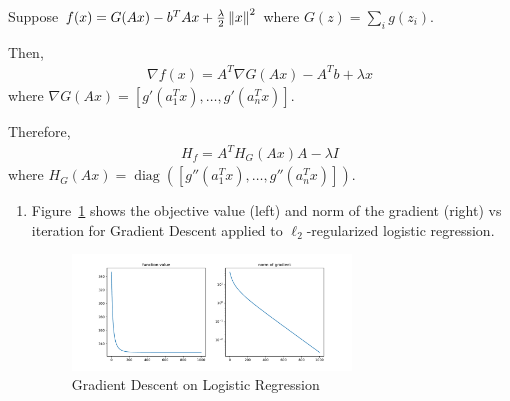 \documentclass[10pt]{article}
\begin{document}
\begin{solution}[Solution]
Suppose \( f(x) = G(Ax) - b^TAx + \frac{\lambda}{2}\left\lVert x\right\rVert^2 \) where \( G(z) = \sum_i g(z_i) \).

Then,
\begin{align*}
    \nabla f(x) =  A^T \nabla G(Ax) - A^Tb + \lambda x
\end{align*}
where \( \nabla G(Ax) = [g'(a_1^Tx), \ldots, g'(a_n^Tx)] \).

Therefore,
\begin{align*}
    H_f = A^T H_G(Ax) A - \lambda I
\end{align*}
where \( H_G(Ax) = \operatorname{diag}([g''(a_1^Tx), \ldots, g''(a_n^Tx)]) \).


\begin{enumerate}[label=(\alph*)]
    \item
        Figure~\ref{logistic_gd} shows the objective value (left) and norm of the gradient (right) vs iteration for Gradient Descent applied to \( \ell_2 \)-regularized logistic regression.
        \begin{figure}\centering
            \includegraphics[width=0.7\textwidth]{img/logistic_gd.pdf}
            \caption{Gradient Descent on Logistic Regression}
            \label{logistic_gd}
        \end{figure}
        

\end{enumerate}
\end{solution}
\end{document}
